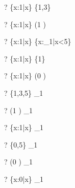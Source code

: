 \documentclass{article}
\begin{document}
\begin{zed} \vdash?  \{x:1|x\} \subseteq \{1,3\} \end{zed}
\begin{zed} \vdash?  \{x:1|x\} \subseteq (1 ) \end{zed}
\begin{zed} \vdash?  \{x:1|x\} \subseteq \{x:\nat_1|x<5\} \end{zed}
\begin{zed} \vdash?  \lnot \{x:1|x\} \subseteq \{1\} \end{zed}
\begin{zed} \vdash?  \lnot \{x:1|x\} \subseteq (0 ) \end{zed}
\begin{zed} \vdash?  \{1,3,5\} \subseteq \nat_1 \end{zed}
\begin{zed} \vdash?  (1 ) \subseteq \nat_1 \end{zed}
\begin{zed} \vdash?  \{x:1|x\} \subseteq \nat_1 \end{zed}
\begin{zed} \vdash?  \lnot \{0,5\} \subseteq \nat_1 \end{zed}
\begin{zed} \vdash?  \lnot (0 ) \subseteq \nat_1 \end{zed}
\begin{zed} \vdash?  \lnot \{x:0|x\} \subseteq \nat_1 \end{zed}
\end{document}
